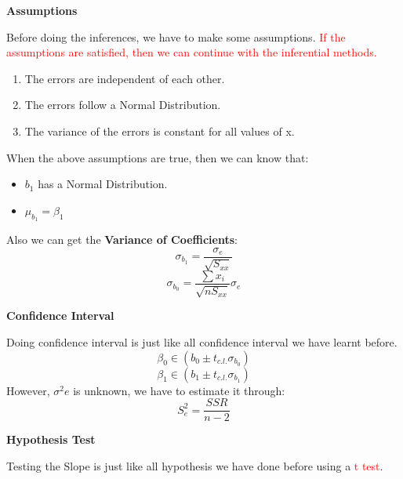 \begin{Center}
    \textbf{Assumptions}
\end{Center}
Before doing the inferences, we have to make some assumptions. \textcolor{red}{If the assumptions are satisfied, then we can continue with the inferential methods.}
\begin{enumerate}
    \item The errors are independent of each other.
    \item The errors follow a Normal Distribution.
    \item The variance of the errors is constant for all values of x.
\end{enumerate}
\vspace{3ex}
\begin{Center}
\end{Center}
When the above assumptions are true, then we can know that:
\begin{itemize}
    \item \(b_1\) has a Normal Distribution.
    \item \(\mu_{b_1}=\beta_1\)
\end{itemize}
Also we can get the \textbf{Variance of Coefficients}:
\begin{equation}
    \sigma_{b_1}=\frac{\sigma_e}{\sqrt{S_{xx}}}
\end{equation}
\begin{equation}
    \sigma_{b_0}=\frac{\sum{x_i}}{\sqrt{nS_{xx}}}\sigma_e
\end{equation}
\newpage
\begin{Center}
    \textbf{Confidence Interval}
\end{Center}
Doing confidence interval is just like all confidence interval we have learnt before.
\begin{equation}
    \beta_0\in (b_0\pm t_{c.l.}\sigma_{b_0})
\end{equation}
\begin{equation}
    \beta_1\in (b_1\pm t_{c.l.}\sigma_{b_1})
\end{equation}
However, \(\sigma^2e\) is unknown, we have to estimate it through:
\begin{equation}
    S^2_e=\frac{SSR}{n-2}
\end{equation}
\vspace{3ex}
\begin{Center}
    \textbf{Hypothesis Test}
\end{Center}
Testing the Slope is just like all hypothesis we have done before using a \textcolor{red}{t test}.\\
